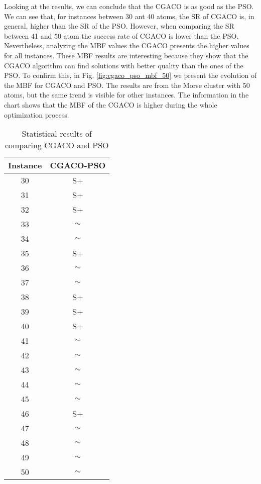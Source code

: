 		Looking at the results, we can conclude that the CGACO is as good as the PSO. We can see that, for instances between 30 ant 40 atoms, the SR of CGACO is, in general, higher than the SR of the PSO. However, when comparing the SR between 41 and 50 atom the success rate of CGACO is lower than the PSO. Nevertheless, analyzing the MBF values the CGACO presents the higher values for all instances. These MBF results are interesting because they show that the CGACO algorithm can find solutions with better quality than the ones of the PSO. To confirm this, in Fig. \ref{fig:cgaco_pso_mbf_50} we present the evolution of the MBF for CGACO and PSO. The results are from the Morse cluster with 50 atoms, but the same trend is visible for other instances. The information in the chart shows that the MBF of the CGACO is higher during the whole optimization process.
		
		\pagebreak
		\begin{table}[!htdp]
				\label{tab:statistical_comparison_pso}
				\begin{center}
					\begin{tabular}{| c | c |}
						\hline
						\textbf{Instance} & \textbf{CGACO-PSO} \\ \hline
						30 & S+ \\ \hline
						31 & S+ \\ \hline
						32 & S+ \\ \hline
						33 & $\sim$ \\ \hline
						34 & $\sim$ \\ \hline
						35 & S+ \\ \hline
						36 & $\sim$ \\ \hline
						37 & $\sim$ \\ \hline
						38 & S+ \\ \hline
						39 & S+\\ \hline
						40 & S+\\ \hline
						41 & $\sim$ \\ \hline
						42 & $\sim$ \\ \hline
						43 & $\sim$ \\ \hline
						44 & $\sim$ \\ \hline
						45 & $\sim$ \\ \hline
						46 & S+\\ \hline
						47 & $\sim$ \\ \hline
						48 & $\sim$ \\ \hline 
						49 & $\sim$ \\ \hline
						50 & $\sim$ \\ \hline
					\end{tabular}
					\caption{Statistical results of comparing CGACO and PSO}
				\end{center}
		\end{table}
		
